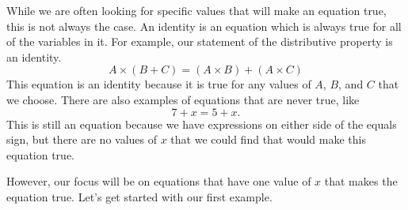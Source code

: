 \documentclass{ximera}
\begin{document}
While we are often looking for specific values that will make an equation true, this is not always the case. An identity is an equation which is always true for all of the variables in it. For example, our statement of the distributive property is an identity.
\[
A \times (B+C) = (A \times B) + (A \times C)
\]
This equation is an identity because it is true for any values of $A$, $B$, and $C$ that we choose. There are also examples of equations that are never true, like
\[
7 + x = 5 + x.
\]
This is still an equation because we have expressions on either side of the equals sign, but there are no values of $x$ that we could find that would make this equation true. 


However, our focus will be on equations that have one value of $x$ that makes the equation true.  Let's get started with our first example.
\end{document}
